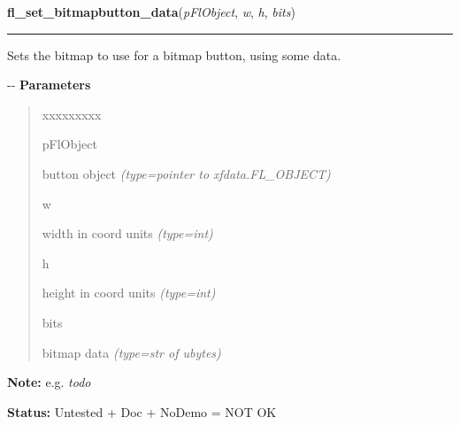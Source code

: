     \label{xformslib:flbutton:fl_set_bitmapbutton_data}

    \vspace{0.5ex}

\hspace{.8\funcindent}\begin{boxedminipage}{\funcwidth}

    \raggedright \textbf{fl\_set\_bitmapbutton\_data}(\textit{pFlObject}, \textit{w}, \textit{h}, \textit{bits})

    \vspace{-1.5ex}

    \rule{\textwidth}{0.5\fboxrule}
\setlength{\parskip}{2ex}

Sets the bitmap to use for a bitmap button, using some data.

-{}-
\setlength{\parskip}{1ex}
      \textbf{Parameters}
      \vspace{-1ex}

      \begin{quote}
        \begin{Ventry}{xxxxxxxxx}

          \item[pFlObject]


button object
            {\it (type=pointer to xfdata.FL\_OBJECT)}

          \item[w]


width in coord units
            {\it (type=int)}

          \item[h]


height in coord units
            {\it (type=int)}

          \item[bits]


bitmap data
            {\it (type=str of ubytes)}

        \end{Ventry}

      \end{quote}

\textbf{Note:} 
e.g. \emph{todo}


\textbf{Status:} 
Untested + Doc + NoDemo = NOT OK


    \end{boxedminipage}

    \label{xformslib:flbutton:fl_add_pixmapbutton}

